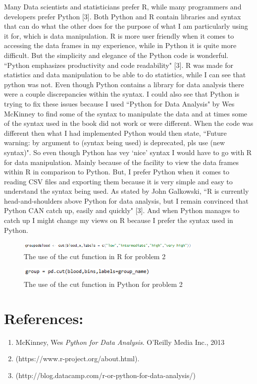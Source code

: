 \documentclass{article}
\begin{document}
\indent Many Data scientists and statisticians prefer R, while many programmers and developers prefer Python [3].  Both Python and R contain libraries and syntax that can do what the other does for the purpose of what I am particularly using it for, which is data manipulation. R is more user friendly when it comes to accessing the data frames in my experience, while in Python it is quite more difficult. But the simplicity and elegance of the Python code is wonderful. ``Python emphasizes productivity and code readability" [3]. R was made for statistics and data manipulation to be able to do statistics, while I can see that python was not. Even though Python contains a library for data analysis there were a couple discrepancies within the syntax. I could also see that Python is trying to fix these issues because I used ``Python for Data Analysis" by Wes McKinney to find some of the syntax to manipulate the data and at times some of the syntax used in the book did not work or were different. When the code was different then what I had implemented Python would then state, ``Future warning: by argument to (syntax being used) is deprecated, pls use (new syntax)".   So even though Python has vey `nice' syntax I would have to go with R for data manipulation. Mainly because of the facility to view the data frames within R in comparison to Python. But, I prefer Python when it comes to reading CSV files and exporting them because it is very simple and easy to understand the syntax being used. As stated by John Galkowski, ``R is currently head-and-shoulders above Python for data analysis, but I remain convinced that Python CAN catch up, easily and quickly" [3]. And when Python manages to catch up I might change my views on R because I prefer the syntax used in Python.   


\begin{figure}[h]
\begin{center}
\includegraphics[width=0.8\textwidth]{RP2.png}
\end{center}
\caption{The use of the cut function in R for problem 2}
\end{figure}

\begin{figure}[h]
\begin{center}
\includegraphics[width=0.6\textwidth]{PP2.png}
\end{center}
\caption{The use of the cut function in Python for problem 2}
\end{figure}

\newpage
\section*{References:}
\begin{enumerate}
\item{McKinney, Wes \emph{Python for Data Analysis}. O'Reilly Media Inc., 2013}
\item{(https://www.r-project.org/about.html).}
\item{(http://blog.datacamp.com/r-or-python-for-data-analysis/)}
\end{enumerate}
\end{document}
